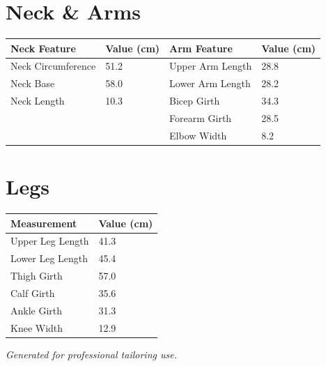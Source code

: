 \documentclass[11pt,a4paper]{article}
\begin{document}
\section*{Neck \& Arms}
\begin{tabular}{p{4cm} p{4cm} p{4cm} p{4cm}}
    \textbf{Neck Feature} & \textbf{Value (cm)} & \textbf{Arm Feature} & \textbf{Value (cm)} \\
    \midrule
    Neck Circumference & 51.2 & Upper Arm Length & 28.8 \\
    Neck Base & 58.0 & Lower Arm Length & 28.2 \\
    Neck Length & 10.3 & Bicep Girth & 34.3 \\
     &  & Forearm Girth & 28.5 \\
     &  & Elbow Width & 8.2 \\
\end{tabular}

\section*{Legs}
\begin{tabular}{p{4cm} p{4cm}}
    \textbf{Measurement} & \textbf{Value (cm)} \\
    \midrule
    Upper Leg Length & 41.3 \\
    Lower Leg Length & 45.4 \\
    Thigh Girth & 57.0 \\
    Calf Girth & 35.6 \\
    Ankle Girth & 31.3 \\
    Knee Width & 12.9 \\
\end{tabular}

\vfill
\begin{center}
    \textit{Generated for professional tailoring use.}
\end{center}
\end{document}

